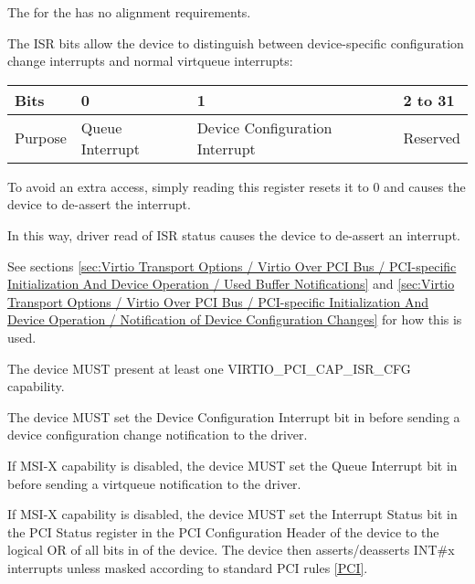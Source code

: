 The  for the  has no alignment requirements.

The ISR bits allow the device to distinguish between device-specific configuration
change interrupts and normal virtqueue interrupts:

\begin{tabular}{ |l||l|l|l| }
\hline
Bits       & 0                               & 1               &  2 to 31 \\
\hline
Purpose    & Queue Interrupt  & Device Configuration Interrupt & Reserved \\
\hline
\end{tabular}

To avoid an extra access, simply reading this register resets it to 0 and
causes the device to de-assert the interrupt.

In this way, driver read of ISR status causes the device to de-assert
an interrupt.

See sections \ref{sec:Virtio Transport Options / Virtio Over PCI Bus / PCI-specific Initialization And Device Operation / Used Buffer Notifications} and \ref{sec:Virtio Transport Options / Virtio Over PCI Bus / PCI-specific Initialization And Device Operation / Notification of Device Configuration Changes} for how this is used.


The device MUST present at least one VIRTIO_PCI_CAP_ISR_CFG capability.  

The device MUST set the Device Configuration Interrupt bit
in  before sending a device configuration
change notification to the driver.

If MSI-X capability is disabled, the device MUST set the Queue
Interrupt bit in  before sending a virtqueue
notification to the driver.

If MSI-X capability is disabled, the device MUST set the Interrupt Status
bit in the PCI Status register in the PCI Configuration Header of
the device to the logical OR of all bits in  of
the device.  The device then asserts/deasserts INT\#x interrupts unless masked
according to standard PCI rules \hyperref[intro:PCI]{[PCI]}.

